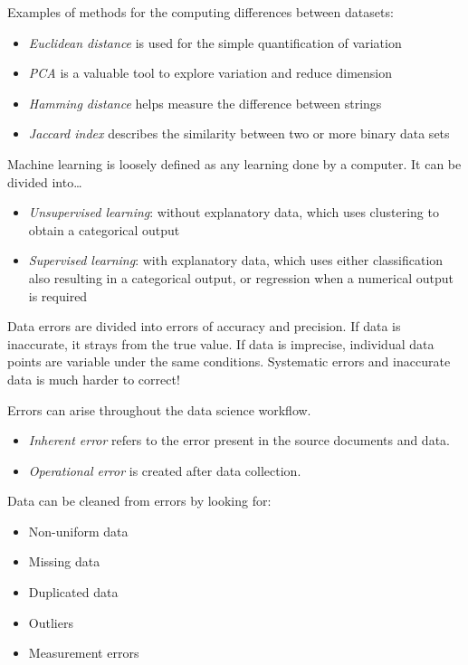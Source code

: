 \documentclass[
]{book}
\providecommand{\tightlist}{%
  \setlength{\itemsep}{0pt}\setlength{\parskip}{0pt}}
\begin{document}
Examples of methods for the computing differences between datasets:

\begin{itemize}
\tightlist
\item
  \emph{Euclidean distance} is used for the simple quantification of variation
\item
  \emph{PCA} is a valuable tool to explore variation and reduce dimension
\item
  \emph{Hamming distance} helps measure the difference between strings
\item
  \emph{Jaccard index} describes the similarity between two or more binary data sets
\end{itemize}

Machine learning is loosely defined as any learning done by a computer. It can be divided into\ldots{}

\begin{itemize}
\tightlist
\item
  \emph{Unsupervised learning}: without explanatory data, which uses clustering to obtain a categorical output
\item
  \emph{Supervised learning}: with explanatory data, which uses either classification also resulting in a categorical output, or regression when a numerical output is required
\end{itemize}

Data errors are divided into errors of accuracy and precision. If data is inaccurate, it strays from the true value. If data is imprecise, individual data points are variable under the same conditions. Systematic errors and inaccurate data is much harder to correct!

Errors can arise throughout the data science workflow.

\begin{itemize}
\tightlist
\item
  \emph{Inherent error} refers to the error present in the source documents and data.
\item
  \emph{Operational error} is created after data collection.
\end{itemize}

Data can be cleaned from errors by looking for:

\begin{itemize}
\tightlist
\item
  Non-uniform data
\item
  Missing data
\item
  Duplicated data
\item
  Outliers
\item
  Measurement errors
\end{itemize}
\end{document}
